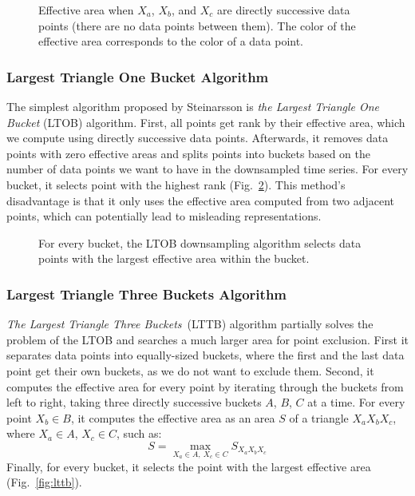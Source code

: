 \begin{figure}[htp]
    \centering
    
    \caption{Effective area when $X_a$, $X_b$, and $X_c$ are directly successive data points (there are no data points between them). The color of the effective area corresponds to the color of a data point.}
    \label{fig:effective-area}
\end{figure}

\subsubsection{Largest Triangle One Bucket Algorithm}
The simplest algorithm proposed by Steinarsson is \textit{the Largest Triangle One Bucket} (LTOB) algorithm. First, all points get rank by their effective area, which we compute using directly successive data points. Afterwards, it removes data points with zero effective areas and splits points into buckets based on the number of data points we want to have in the downsampled time series. For every bucket, it selects point with the highest rank (Fig.~\ref{fig:ltob}). This method's disadvantage is that it only uses the effective area computed from two adjacent points, which can potentially lead to misleading representations.

\begin{figure}[htp]
    \centering
    
    \caption{For every bucket, the LTOB downsampling algorithm selects data points with the largest effective area within the bucket.}
    \label{fig:ltob}
\end{figure}

\subsubsection{Largest Triangle Three Buckets Algorithm}
\textit{The Largest Triangle Three Buckets}~(LTTB) algorithm partially solves the problem of the LTOB and searches a much larger area for point exclusion. First it separates data points into equally-sized buckets, where the first and the last data point get their own buckets, as we do not want to exclude them. Second, it computes the effective area for every point by iterating through the buckets from left to right, taking three directly successive buckets $A$, $B$, $C$ at a time. For every point $X_b \in B$, it computes the effective area as an area $S$ of a triangle $X_a X_b X_c$, where $X_a \in A$, $X_c \in C$, such as:
\begin{equation}
    S = \max_{X_a \in A,~X_c \in C} S_{X_a X_b X_c}
\end{equation}
Finally, for every bucket, it selects the point with the largest effective area (Fig.~\ref{fig:lttb}).

